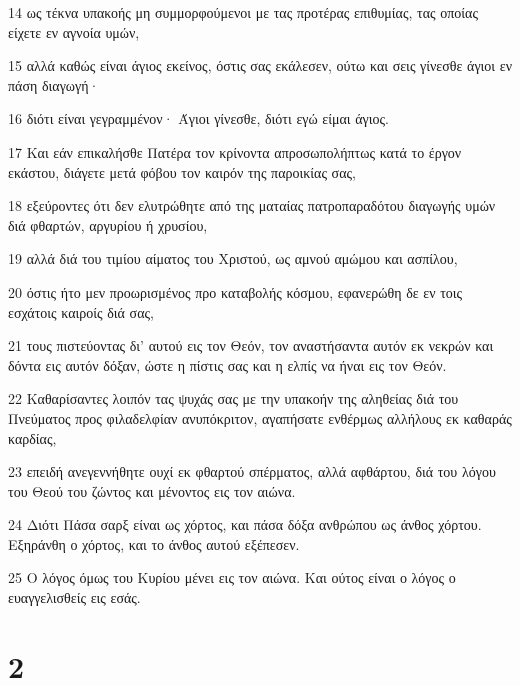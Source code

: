 \par 14 ως τέκνα υπακοής μη συμμορφούμενοι με τας προτέρας επιθυμίας, τας οποίας είχετε εν αγνοία υμών,
\par 15 αλλά καθώς είναι άγιος εκείνος, όστις σας εκάλεσεν, ούτω και σεις γίνεσθε άγιοι εν πάση διαγωγή·
\par 16 διότι είναι γεγραμμένον· Άγιοι γίνεσθε, διότι εγώ είμαι άγιος.
\par 17 Και εάν επικαλήσθε Πατέρα τον κρίνοντα απροσωπολήπτως κατά το έργον εκάστου, διάγετε μετά φόβου τον καιρόν της παροικίας σας,
\par 18 εξεύροντες ότι δεν ελυτρώθητε από της ματαίας πατροπαραδότου διαγωγής υμών διά φθαρτών, αργυρίου ή χρυσίου,
\par 19 αλλά διά του τιμίου αίματος του Χριστού, ως αμνού αμώμου και ασπίλου,
\par 20 όστις ήτο μεν προωρισμένος προ καταβολής κόσμου, εφανερώθη δε εν τοις εσχάτοις καιροίς διά σας,
\par 21 τους πιστεύοντας δι' αυτού εις τον Θεόν, τον αναστήσαντα αυτόν εκ νεκρών και δόντα εις αυτόν δόξαν, ώστε η πίστις σας και η ελπίς να ήναι εις τον Θεόν.
\par 22 Καθαρίσαντες λοιπόν τας ψυχάς σας με την υπακοήν της αληθείας διά του Πνεύματος προς φιλαδελφίαν ανυπόκριτον, αγαπήσατε ενθέρμως αλλήλους εκ καθαράς καρδίας,
\par 23 επειδή ανεγεννήθητε ουχί εκ φθαρτού σπέρματος, αλλά αφθάρτου, διά του λόγου του Θεού του ζώντος και μένοντος εις τον αιώνα.
\par 24 Διότι Πάσα σαρξ είναι ως χόρτος, και πάσα δόξα ανθρώπου ως άνθος χόρτου. Εξηράνθη ο χόρτος, και το άνθος αυτού εξέπεσεν.
\par 25 Ο λόγος όμως του Κυρίου μένει εις τον αιώνα. Και ούτος είναι ο λόγος ο ευαγγελισθείς εις εσάς.

\chapter{2}

